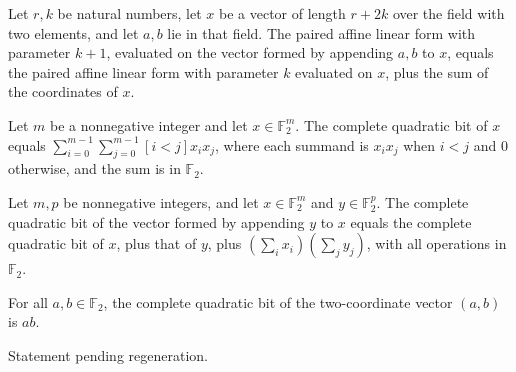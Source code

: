 \begin{theorem}
\label{FABL.pairedAffineLinearForm_succ_appendTwo}
\leanok
{}
Let $r,k$ be natural numbers, let $x$ be a vector of length $r+2k$ over the field with
two elements, and let $a,b$ lie in that field. The paired affine linear form with
parameter $k+1$, evaluated on the vector formed by appending $a,b$ to $x$, equals the
paired affine linear form with parameter $k$ evaluated on $x$, plus the sum of the
coordinates of $x$.
\end{theorem}

\begin{theorem}
\label{FABL.completeQuadraticBit_eq_full_sum}
\leanok
{}
Let $m$ be a nonnegative integer and let $x\in\mathbb{F}_2^m$. The complete quadratic
bit of $x$ equals $\sum_{i=0}^{m-1}\sum_{j=0}^{m-1} [i<j]x_i x_j$, where each summand is
$x_i x_j$ when $i<j$ and $0$ otherwise, and the sum is in $\mathbb{F}_2$.
\end{theorem}

\begin{theorem}
\label{FABL.completeQuadraticBit_append}
\leanok
{}
Let $m,p$ be nonnegative integers, and let $x\in\mathbb{F}_2^m$ and
$y\in\mathbb{F}_2^p$. The complete quadratic bit of the vector formed by appending $y$
to $x$ equals the complete quadratic bit of $x$, plus that of $y$, plus $(\sum_i
x_i)(\sum_j y_j)$, with all operations in $\mathbb{F}_2$.
\end{theorem}

\begin{theorem}
\label{FABL.completeQuadraticBit_two}
\leanok
{}
For all $a,b\in\mathbb{F}_2$, the complete quadratic bit of the two-coordinate vector
$(a,b)$ is $ab$.
\end{theorem}

\begin{theorem}
\label{FABL.completeQuadraticBit_appendTwo}
\leanok
{}
Statement pending regeneration.
\end{theorem}

